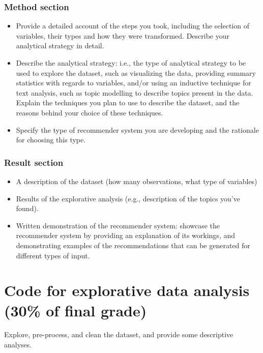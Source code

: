 \subsubsection{Method section}
\begin{itemize}
	\item Provide a detailed account of the steps you took, including the selection of variables, their types and how they were transformed. Describe your analytical strategy in detail.
	\item Describe the analytical strategy: i.e., the type of analytical strategy to be used to explore the dataset, such as visualizing the data, providing summary statistics with regards to variables, and/or using an inductive technique for text analysis, such as topic modelling to describe topics present in the data. Explain the techniques you plan to use to describe the dataset, and the reasons behind your choice of these techniques.
	\item Specify the type of recommender system you are developing and the rationale for choosing this type.
\end{itemize}

\subsubsection{Result section}
\begin{itemize}
	\item A description of the dataset (how many observations, what type of variables)
	\item Results of the explorative analysis (e.g., description of the topics you've found).
	\item Written demonstration of the recommender system: showcase the recommender system by providing an explanation of its workings, and demonstrating examples of the recommendations that can be generated for different types of input.
\end{itemize}

\section{Code for explorative data analysis (30\% of final grade)}

Explore, pre-process, and clean the dataset, and provide some descriptive analyses.

